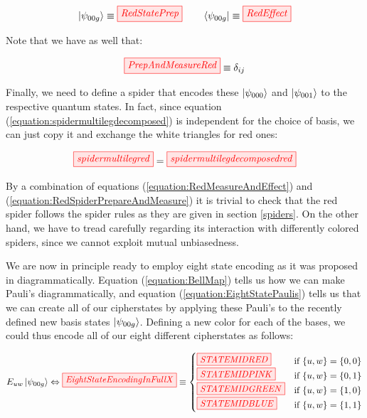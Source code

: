 \documentclass[]{article}
\begin{document}
\begin{equation}
	\ket{\psi_{00g}} \equiv \tikzfig{RedStatePrep} ~~~~~~ \bra{\psi_{00g}} \equiv \tikzfig{RedEffect}
\end{equation}

Note that we have as well that:

\begin{equation}
\label{equation:RedMeasureAndEffect}
\tikzfig{PrepAndMeasureRed} \equiv \delta_{ij}
\end{equation}

Finally, we need to define a spider that encodes these $\ket{\psi_{000}}$ and $\ket{\psi_{001}}$ to the respective quantum states. In fact, since equation (\ref{equation:spidermultilegdecomposed}) is independent for the choice of basis, we can just copy it and exchange the white triangles for red ones:

\begin{equation}
	\label{equation:RedSpiderPrepareAndMeasure}
\tikzfig{spidermultilegred} = \tikzfig{spidermultilegdecomposedred}
\end{equation}

By a combination of equations (\ref{equation:RedMeasureAndEffect}) and (\ref{equation:RedSpiderPrepareAndMeasure}) it is trivial to check that the red spider follows the spider rules as they are given in section \ref{spiders}. On the other hand, we have to tread carefully regarding its interaction with differently colored spiders, since we cannot exploit mutual unbiasedness.

We are now in principle ready to employ eight state encoding as it was proposed in \cite{DeVries2016} diagrammatically. Equation (\ref{equation:BellMap}) tells us how we can make Pauli's diagrammatically, and equation (\ref{equation:EightStatePaulis}) tells us that we can create all of our cipherstates by applying these Pauli's to the recently defined new basis states $\ket{\psi_{00g}}$. Defining a new color for each of the bases, we could thus encode all of our eight different cipherstates as follows:

\begin{equation}
	\label{equation:EightStateEncodingInFull}
	E_{uw}\ket{\psi_{00g}} \Leftrightarrow\tikzfig{EightStateEncodingInFullX} \equiv 
	\begin{cases}
	\tikzfig{STATEMIDRED} & \text{if} ~\{u,w\} = \{0,0\} \\
	\tikzfig{STATEMIDPINK} & \text{if} ~\{u,w\} = \{0,1\} \\
	\tikzfig{STATEMIDGREEN} & \text{if} ~\{u,w\} = \{1,0\} \\
	\tikzfig{STATEMIDBLUE} & \text{if} ~\{u,w\} = \{1,1\} \\
	\end{cases}
\end{equation}
\end{document}
